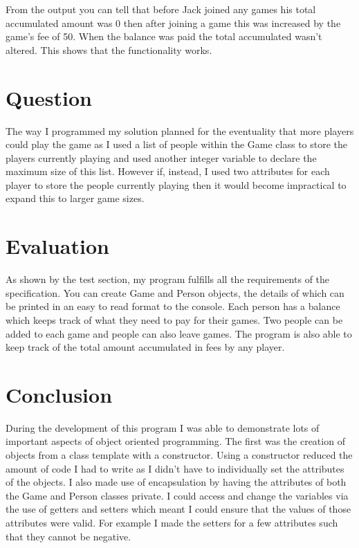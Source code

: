 \documentclass[a4paper]{article}
\begin{document}


 \newline

From the output you can tell that before Jack joined any games his total accumulated amount was 0 then after joining a game this was increased by the game's fee of 50. When the balance was paid the total accumulated wasn't altered. This shows that the functionality works. 

\section*{Question}
The way I programmed my solution planned for the eventuality that more players could play the game as I used a list of people within the Game class to store the players currently playing and used another integer variable to declare the maximum size of this list. However if, instead, I used two attributes for each player to store the people currently playing then it would become impractical to expand this to larger game sizes.
\section*{Evaluation}
As shown by the test section, my program fulfills all the requirements of the specification. You can create Game and Person objects, the details of which  can be printed in an easy to read format to the console. Each person has a balance which keeps track of what they need to pay for their games. Two people can be added to each game and people can also leave games. The program is also able to keep track of the total amount accumulated in fees by any player.
\section*{Conclusion}
During the development of this program I was able to demonstrate lots of important aspects of object oriented programming. The first was the creation of objects from a class template with a constructor. Using a constructor reduced the amount of code I had to write as I didn't have to individually set the attributes of the objects. I also made use of encapsulation by having the attributes of both the Game and Person classes private. I could access and change the variables via the use of getters and setters which meant I could ensure that the values of those attributes were valid. For example I made the setters for a few attributes such that they cannot be negative.
\end{document}

